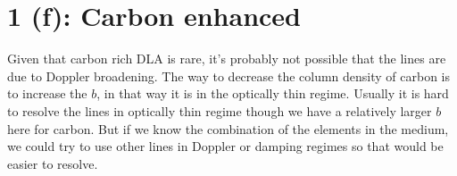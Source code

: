 \documentclass[12pt,letterpaper]{article}
\begin{document}
\section*{1 (f): Carbon enhanced}
Given that carbon rich DLA is rare, it's probably not possible that the lines are due to Doppler broadening.
The way to decrease the column density of carbon is to increase the $b$, in that way it is in the optically thin regime.
Usually it is hard to resolve the lines in optically thin regime though we have a relatively larger $b$ here for carbon.
But if we know the combination of the elements in the medium, we could try to use other lines in Doppler or damping regimes so that would be easier to resolve.
\end{document}
